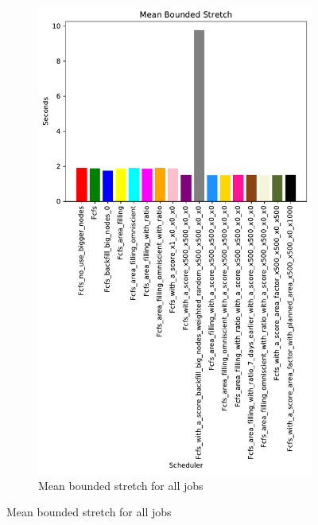 \documentclass[a4paper]{article}
\begin{document}
\begin{figure}[H]\centering
\begin{subfigure}[b]{0.4\linewidth}\centering\includegraphics[width=0.7\linewidth]{MBSS/plot/Results_Size_And_Data_2022-02-02->2022-02-03_V9532_Mean_Stretch_With_a_Minimum_450_128_32_256_4_1024.pdf}\caption{Mean bounded stretch for all jobs}\label{45}\end{subfigure}

\end{figure}
\end{document}
